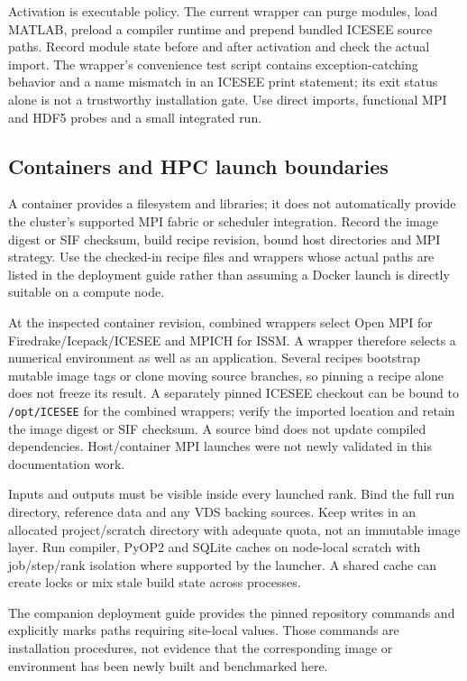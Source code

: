 \documentclass[11pt,a4paper]{article}
\newcommand{\code}[1]{\nolinkurl{#1}}
\begin{document}
Activation is executable policy. The current wrapper can purge modules, load MATLAB, preload a compiler runtime and prepend bundled ICESEE source paths. Record module state before and after activation and check the actual import. The wrapper's convenience test script contains exception-catching behavior and a name mismatch in an ICESEE print statement; its exit status alone is not a trustworthy installation gate. Use direct imports, functional MPI and HDF5 probes and a small integrated run.

\subsection{Containers and HPC launch boundaries}
A container provides a filesystem and libraries; it does not automatically provide the cluster's supported MPI fabric or scheduler integration. Record the image digest or SIF checksum, build recipe revision, bound host directories and MPI strategy. Use the checked-in recipe files and wrappers whose actual paths are listed in the deployment guide rather than assuming a Docker launch is directly suitable on a compute node.

At the inspected container revision, combined wrappers select Open MPI for Firedrake/Icepack/ICESEE and MPICH for ISSM. A wrapper therefore selects a numerical environment as well as an application. Several recipes bootstrap mutable image tags or clone moving source branches, so pinning a recipe alone does not freeze its result. A separately pinned ICESEE checkout can be bound to \code{/opt/ICESEE} for the combined wrappers; verify the imported location and retain the image digest or SIF checksum. A source bind does not update compiled dependencies. Host/container MPI launches were not newly validated in this documentation work.

Inputs and outputs must be visible inside every launched rank. Bind the full run directory, reference data and any VDS backing sources. Keep writes in an allocated project/scratch directory with adequate quota, not an immutable image layer. Run compiler, PyOP2 and SQLite caches on node-local scratch with job/step/rank isolation where supported by the launcher. A shared cache can create locks or mix stale build state across processes.

The companion deployment guide provides the pinned repository commands and explicitly marks paths requiring site-local values. Those commands are installation procedures, not evidence that the corresponding image or environment has been newly built and benchmarked here.
\end{document}
